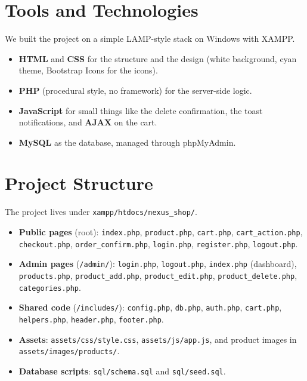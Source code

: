 \documentclass[11pt,a4paper]{article}
\begin{document}
\section{Tools and Technologies}

We built the project on a simple LAMP-style stack on Windows with XAMPP.

\begin{itemize}
    \item \textbf{HTML} and \textbf{CSS} for the structure and the design
        (white background, cyan theme, Bootstrap Icons for the icons).
    \item \textbf{PHP} (procedural style, no framework) for the
        server-side logic.
    \item \textbf{JavaScript} for small things like the delete
        confirmation, the toast notifications, and \textbf{AJAX} on the
        cart.
    \item \textbf{MySQL} as the database, managed through phpMyAdmin.
\end{itemize}

\section{Project Structure}

The project lives under \texttt{xampp/htdocs/nexus\_shop/}.

\begin{itemize}
    \item \textbf{Public pages} (root): \texttt{index.php},
        \texttt{product.php}, \texttt{cart.php},
        \texttt{cart\_action.php}, \texttt{checkout.php},
        \texttt{order\_confirm.php}, \texttt{login.php},
        \texttt{register.php}, \texttt{logout.php}.
    \item \textbf{Admin pages} (\texttt{/admin/}): \texttt{login.php},
        \texttt{logout.php}, \texttt{index.php} (dashboard),
        \texttt{products.php}, \texttt{product\_add.php},
        \texttt{product\_edit.php}, \texttt{product\_delete.php},
        \texttt{categories.php}.
    \item \textbf{Shared code} (\texttt{/includes/}): \texttt{config.php},
        \texttt{db.php}, \texttt{auth.php}, \texttt{cart.php},
        \texttt{helpers.php}, \texttt{header.php}, \texttt{footer.php}.
    \item \textbf{Assets}: \texttt{assets/css/style.css},
        \texttt{assets/js/app.js}, and product images in
        \texttt{assets/images/products/}.
    \item \textbf{Database scripts}: \texttt{sql/schema.sql} and
        \texttt{sql/seed.sql}.
\end{itemize}
\end{document}
